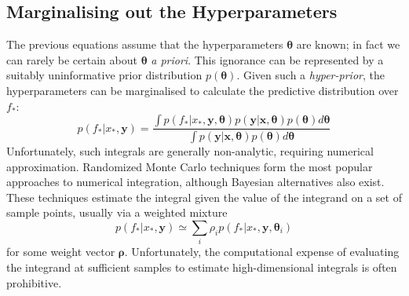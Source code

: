 \documentclass{article}
\newcommand\jansays[1]{\textcolor{blue}{Jan says: #1}}
\newcommand{\xd}{\mathbf{x}}
\newcommand{\yd}{\mathbf{y}}
\begin{document}
\subsection{Marginalising out the Hyperparameters}
The previous equations assume that the hyperparameters $\bm{\theta}$ are known; in fact we can rarely be certain about $\bm{\theta}$ \emph{a priori}. This ignorance can be represented by a suitably uninformative prior distribution $p(\bm{\theta})$. Given such a \emph{hyper-prior}, the hyperparameters can be marginalised to calculate the predictive distribution over $f_*$:
\begin{equation}\label{fullmargint}
p(f_* |x_*, \yd) = \frac{\int p(f_* | x_*, \yd,\bm{\theta})p(\yd|\xd,\bm{\theta})p(\bm{\theta})d\bm{\theta}}{\int p(\yd|\xd,\bm{\theta})p(\bm{\theta})d\bm{\theta}}
\end{equation}
Unfortunately, such integrals are generally non-analytic, requiring numerical approximation. Randomized Monte Carlo techniques \cite{chen2000monte} form the most popular approaches to numerical integration, although Bayesian alternatives \cite{bayesquad, osbornebayesquad} also exist. 
These techniques estimate the integral given
the value of the integrand on a set of sample points, usually via a weighted mixture
\begin{equation}\label{sampling}
p(f_* |x_*, \yd) \simeq \sum_i \rho_i p(f_* | x_*, \yd,\bm{\theta}_i)
\end{equation}
for some weight vector $\bm{\rho}$. Unfortunately, the computational expense of evaluating the integrand at sufficient samples to estimate high-dimensional integrals is often prohibitive. %
\end{document}
